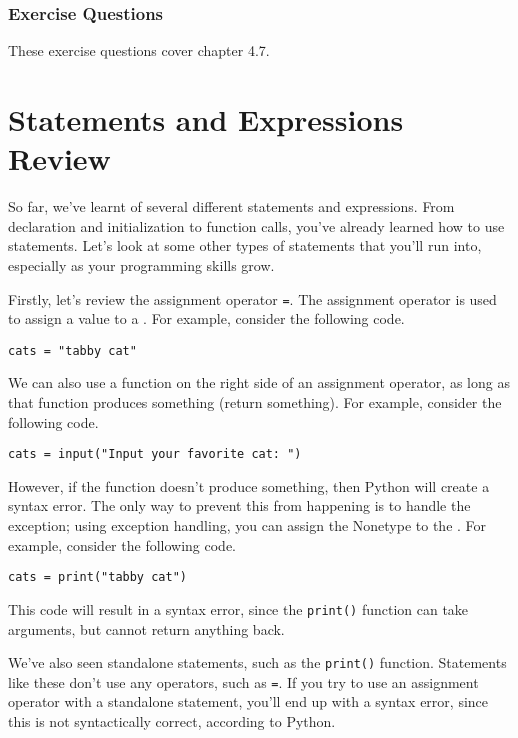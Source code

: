\subsubsection*{Exercise Questions}
These exercise questions cover chapter 4.7.
\begin{Exercise}
\Question{}
\end{Exercise}
\section{Statements and Expressions Review}
So far, we've learnt of several different statements and expressions. From  declaration and initialization to function calls, you've already learned how to use statements. Let's look at some other types of statements that you'll run into, especially as your programming skills grow.\par
Firstly, let's review the assignment operator \verb|=|. The assignment operator is used to assign a value to a . For example, consider the following code.\par
\begin{lstlisting}[style=pippython]
cats = "tabby cat"
\end{lstlisting}
We can also use a function on the right side of an assignment operator, as long as that function produces something (return something). For example, consider the following code.\par
\begin{lstlisting}[style=pippython]
cats = input("Input your favorite cat: ")
\end{lstlisting}
However, if the function doesn't produce something, then Python will create a syntax error. The only way to prevent this from happening is to handle the exception; using exception handling, you can assign the Nonetype to the . For example, consider the following code.\par
\begin{lstlisting}[style=pippython]
cats = print("tabby cat")
\end{lstlisting}
This code will result in a syntax error, since the \verb|print()| function can take arguments, but cannot return anything back.\par
We've also seen standalone statements, such as the \verb|print()| function. Statements like these don't use any operators, such as \verb|=|. If you try to use an assignment operator with a standalone statement, you'll end up with a syntax error, since this is not syntactically correct, according to Python.\par
